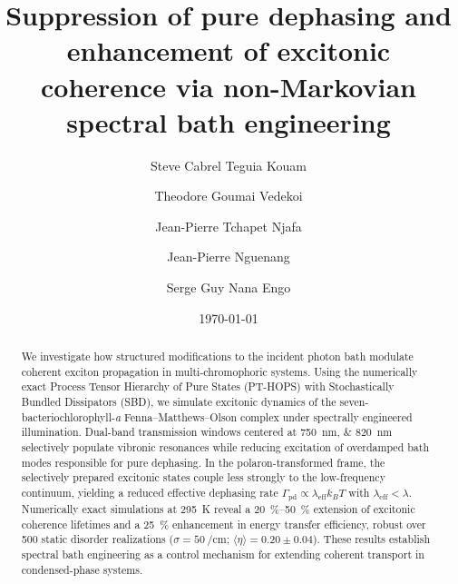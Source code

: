 \documentclass[aip,jcp,preprint]{revtex4-2}
\begin{document}
\title{Suppression of pure dephasing and enhancement of excitonic coherence via non-Markovian spectral bath engineering}

\author{Steve Cabrel Teguia Kouam}

\author{Theodore Goumai Vedekoi}

\author{Jean-Pierre Tchapet Njafa}

\author{Jean-Pierre Nguenang}

\author{Serge Guy Nana Engo}

\date{\today}

\begin{abstract}
We investigate how structured modifications to the incident photon bath modulate coherent exciton propagation in multi-chromophoric systems. Using the numerically exact Process Tensor Hierarchy of Pure States (PT-HOPS) with Stochastically Bundled Dissipators (SBD), we simulate excitonic dynamics of the seven-bacteriochlorophyll-\textit{a} Fenna--Matthews--Olson complex under spectrally engineered illumination. Dual-band transmission windows centered at \SIlist{750;820}{\nano\meter} selectively populate vibronic resonances while reducing excitation of overdamped bath modes responsible for pure dephasing. In the polaron-transformed frame, the selectively prepared excitonic states couple less strongly to the low-frequency continuum, yielding a reduced effective dephasing rate $\Gamma_{\mathrm{pd}} \propto \lambda_{\mathrm{eff}} k_B T$ with $\lambda_{\mathrm{eff}} < \lambda$. Numerically exact simulations at \SI{295}{\kelvin} reveal a \SIrange{20}{50}{\percent} extension of excitonic coherence lifetimes and a \SI{25}{\percent} enhancement in energy transfer efficiency, robust over \num{500} static disorder realizations ($\sigma = \SI{50}{\per\centi\meter}$; $\langle\eta\rangle = 0.20 \pm 0.04$). These results establish spectral bath engineering as a control mechanism for extending coherent transport in condensed-phase systems.
\end{abstract}
\end{document}
